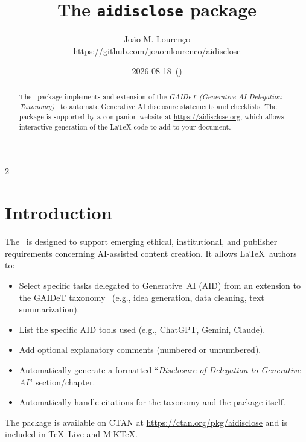\documentclass[11pt]{article}
\begin{document}
\title{The \texttt{aidisclose} package}
\author{João M. Lourenço\\\url{https://github.com/joaomlourenco/aidisclose}}
\date{2026-08-18~(\aidversion)}
\maketitle

\begin{abstract}
    The \AIDpackageName\ package implements and extension of the \emph{GAIDeT (Generative AI Delegation Taxonomy)}~\cite{Suchikova:2025:GAIDeT} to automate Generative AI disclosure statements and checklists.
    The package is supported by a companion website at \url{https://aidisclose.org}, which allows interactive generation of the LaTeX code to add to your document.
\end{abstract}

\begin{multicols}{2}
  \footnotesize
\tableofcontents
\end{multicols}

\section{Introduction}
\label{sec:introduction}

The \AIDpackageName\ is designed to support emerging ethical, institutional, and publisher requirements concerning AI-assisted content creation.
It allows \LaTeX\ authors to:

\begin{itemize}
    \item Select specific tasks delegated to Generative~AI (AID) from an extension to the GAIDeT taxonomy~\cite{Suchikova:2025:GAIDeT} (e.g., idea generation, data cleaning, text summarization).
    \item List the specific AID tools used (e.g., ChatGPT, Gemini, Claude).
    \item Add optional explanatory comments (numbered or unnumbered).
    \item Automatically generate a formatted “\emph{Disclosure of Delegation to Generative AI}” section/chapter.
    \item Automatically handle citations for the taxonomy and the package itself.
\end{itemize}

The package is available on CTAN at \url{https://ctan.org/pkg/aidisclose} and is included in TeX~Live and MiKTeX.
\end{document}
